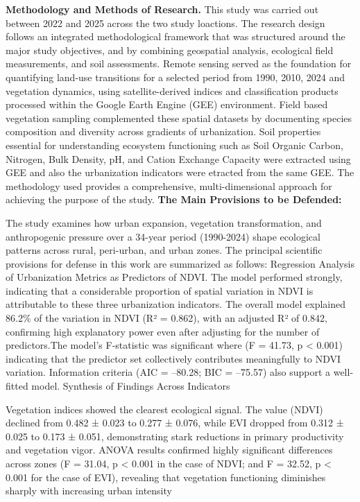 \textbf{Methodology and Methods of Research.} This study was carried out between 2022 and 2025 across the two study loactions. The research design follows an integrated methodological framework that was structured around the major study objectives, and by combining geospatial analysis, ecological field measurements, and soil assessments. Remote sensing served as the foundation for quantifying land-use transitions for a selected period from 1990, 2010, 2024 and vegetation dynamics, using satellite-derived indices and classification products processed within the Google Earth Engine (GEE) environment. Field based vegetation sampling complemented these spatial datasets by documenting species composition and diversity across gradients of urbanization. Soil properties essential for understanding ecosystem functioning such as Soil Organic Carbon, Nitrogen, Bulk Density, pH, and Cation Exchange Capacity were extracted using GEE and also the urbanization indicators were etracted from the same GEE. The methodology used provides a comprehensive, multi-dimensional approach for achieving the purpose of the study.
{}\textbf{The Main Provisions to be Defended:}

The study examines how urban expansion, vegetation transformation, and anthropogenic pressure over a 34-year period (1990-2024) shape ecological patterns across rural, peri-urban, and urban zones. The principal scientific provisions for defense in this work are summarized as follows:
Regression Analysis of Urbanization Metrics as Predictors of NDVI.
The model performed strongly, indicating that a considerable proportion of spatial variation in NDVI is attributable to these three urbanization indicators. The overall model explained 86.2\% of the variation in NDVI (R² = 0.862), with an adjusted R² of 0.842, confirming high explanatory power even after adjusting for the number of predictors.The model's F-statistic was significant where (F = 41.73, p \textless{} 0.001) indicating that the predictor set collectively contributes meaningfully to NDVI variation. Information criteria (AIC = --80.28; BIC = --75.57) also support a well-fitted model.
Synthesis of Findings Across Indicators

Vegetation indices showed the clearest ecological signal. The value (NDVI) declined from 0.482 ± 0.023 to 0.277 ± 0.076, while EVI dropped from 0.312 ± 0.025 to 0.173 ± 0.051, demonstrating stark reductions in primary productivity and vegetation vigor. ANOVA results confirmed highly significant differences across zones (F = 31.04, p \textless{} 0.001 in the case of NDVI; and F = 32.52, p \textless{} 0.001 for the case of EVI), revealing that vegetation functioning diminishes sharply with increasing urban intensity

